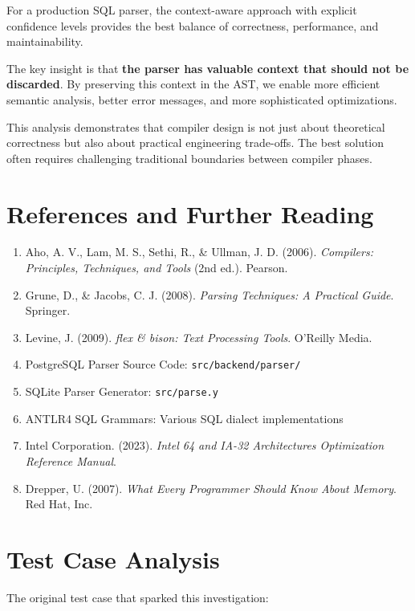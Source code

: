 \documentclass[11pt,a4paper]{article}
\begin{document}
For a production SQL parser, the context-aware approach with explicit confidence levels provides the best balance of correctness, performance, and maintainability.

The key insight is that \textbf{the parser has valuable context that should not be discarded}. By preserving this context in the AST, we enable more efficient semantic analysis, better error messages, and more sophisticated optimizations.

This analysis demonstrates that compiler design is not just about theoretical correctness but also about practical engineering trade-offs. The best solution often requires challenging traditional boundaries between compiler phases.

\section{References and Further Reading}

\begin{enumerate}
    \item Aho, A. V., Lam, M. S., Sethi, R., \& Ullman, J. D. (2006). \textit{Compilers: Principles, Techniques, and Tools} (2nd ed.). Pearson.
    \item Grune, D., \& Jacobs, C. J. (2008). \textit{Parsing Techniques: A Practical Guide}. Springer.
    \item Levine, J. (2009). \textit{flex \& bison: Text Processing Tools}. O'Reilly Media.
    \item PostgreSQL Parser Source Code: \texttt{src/backend/parser/}
    \item SQLite Parser Generator: \texttt{src/parse.y}
    \item ANTLR4 SQL Grammars: Various SQL dialect implementations
    \item Intel Corporation. (2023). \textit{Intel 64 and IA-32 Architectures Optimization Reference Manual}.
    \item Drepper, U. (2007). \textit{What Every Programmer Should Know About Memory}. Red Hat, Inc.
\end{enumerate}

\appendix

\section{Test Case Analysis}

The original test case that sparked this investigation:
\end{document}
